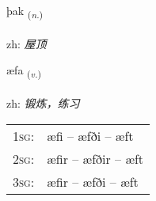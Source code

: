 \documentclass[frontgrid, backgrid]{flacards}\usepackage[]{graphicx}\usepackage[]{color}
\begin{document}
{þak \small{\textsubscript{(\textit{n.})}} \\[1ex] %
\textphonetic{[θaːk]} \\
zh: \emph{屋顶} \\  [2ex]
\renewcommand*{\arraystretch}{0.8}
}

\renewcommand{\flhead}{\vskip5pt \fboxsep=0pt {\small\bfseries\footnotesize Sagnorð | 动词}}
\renewcommand{\fcfoot}{\vskip5pt \fboxsep=0pt \hspace{2pt}{\small\bfseries\footnotesize 2K}}

\renewcommand{\blhead}{\vskip5pt {\small\bfseries\footnotesize Sagnorð | 动词 }}
\renewcommand{\bcfoot}{\vskip5pt \hspace{2pt}{\small\bfseries\footnotesize 2K}}


{æfa \small{\textsubscript{(\textit{v.})}} \\[1ex] %
\textphonetic{[aiːva]} \\
zh: \emph{锻炼，练习} \\  [2ex]
\renewcommand*{\arraystretch}{0.8}
\begin{tabular}{p{1cm}l}
\textsc{1sg}: & æfi -- æfði -- æft \\ 
\textsc{2sg}: & æfir -- æfðir -- æft \\ 
\textsc{3sg}: & æfir -- æfði -- æft \\ 
\end{tabular}
}

\renewcommand{\flhead}{\vskip5pt \fboxsep=0pt {\small\bfseries\footnotesize Nafnorð | 名词}}
\renewcommand{\fcfoot}{\vskip5pt \fboxsep=0pt \hspace{2pt}{\small\bfseries\footnotesize 2K}}

\renewcommand{\blhead}{\vskip5pt {\small\bfseries\footnotesize Nafnorð | 名词 }}
\renewcommand{\bcfoot}{\vskip5pt \hspace{2pt}{\small\bfseries\footnotesize 2K}}
\end{document}
